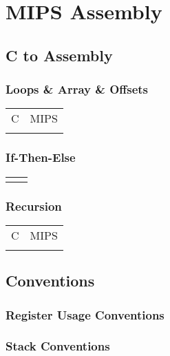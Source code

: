 \section{MIPS Assembly}

\subsection{C to Assembly}

\subsubsection{Loops \& Array \& Offsets}

\begin{tabular}{p{2in} p{4.5in}}
    C & MIPS \\

    
    &
    
    \\
\end{tabular}

\subsubsection{If-Then-Else}

\begin{tabular}{p{2in} p{4.5in}}
  
  &
  
  \\
\end{tabular}

\subsubsection{Recursion}

\begin{tabular}{p{2in} p{4.5in}}
  C & MIPS \\
  
  &
  
  \\
\end{tabular}

\subsection{Conventions}

\subsubsection{Register Usage Conventions}



\subsubsection{Stack Conventions}

